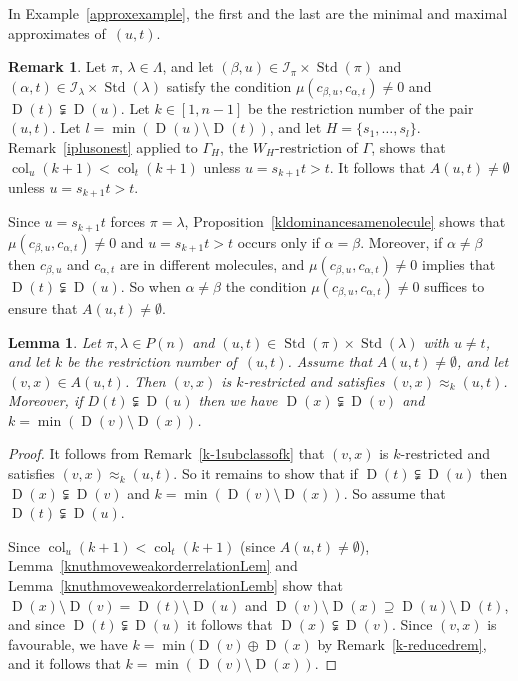 \documentclass[10pt]{amsart}
\newtheorem{lemm}[theo]{Lemma}
\theoremstyle{definition}
\newtheorem{rema}[theo]{Remark}
\DeclareMathOperator{\col}{col}
\DeclareMathOperator{\STD}{Std}
\DeclareMathOperator{\D}{D}
\begin{document}
In Example~\ref{approxexample}, the first and the last are the minimal and maximal approximates of~$(u,t)$.

\begin{rema}\label{nonemptyAkst}
Let $\pi,\,\lambda\in\Lambda$, and
let $(\beta,u)\in\mathcal{I}_{\pi}\times\STD(\pi)$ and
$(\alpha,t)\in\mathcal{I}_{\lambda}\times\STD(\lambda)$ satisfy the condition
$\mu(c_{\beta,u},c_{\alpha,t}) \neq 0$ and $\D(t) \subsetneqq \D(u)$.
Let $k\in[1,n-1]$ be the restriction number of the pair
$(u,t)$. Let $l=\min(\D(u)\setminus\D(t))$, and let
$H=\{s_1,\ldots,s_l\}$. Remark~\ref{iplusonest} applied to $\Gamma_H$,
the $W_H$-restriction of $\Gamma$, shows that $\col_u(k+1)<\col_t(k+1)$
unless $u=s_{k+1}t>t$. It follows that $A(u,t)\ne\emptyset$
unless $u=s_{k+1}t>t$.

Since $u=s_{k+1}t$ forces $\pi=\lambda$, Proposition~\ref{kldominancesamenolecule}
shows that $\mu(c_{\beta,u},c_{\alpha,t}) \neq 0$ and $u=s_{k+1}t>t$ occurs only
if $\alpha=\beta$. Moreover, if $\alpha\neq\beta$ then
$c_{\beta,u}$ and $c_{\alpha,t}$ are in different molecules, and
$\mu(c_{\beta,u},c_{\alpha,t})\neq 0$ implies that $\D(t) \subsetneqq \D(u)$.
So when $\alpha\neq\beta$ the condition $\mu(c_{\beta,u},c_{\alpha,t})\neq 0$
suffices to ensure that $A(u,t)\neq\emptyset$.
\end{rema}

\begin{lemm}\label{k-minimallemma1}
Let $\pi,\lambda\in P(n)$ and $(u,t)\in\STD(\pi)\times\STD(\lambda)$
with $u\neq t$, and let $k$ be the restriction number of~$(u,t)$.
Assume that $A(u,t)\neq\emptyset$, and let
$(v,x)\in A(u,t)$. Then $(v,x)$ is $k$-restricted and satisfies
$(v,x)\approx_k(u,t)$.
Moreover, if $D(t)\subsetneqq\D(u)$ then we have
$\D(x)\subsetneqq\D(v)$ and $k=\min(\D(v)\setminus\D(x))$.
\end{lemm}

\begin{proof}
It follows from Remark~\ref{k-1subclassofk} that $(v,x)$ is $k$-restricted and
satisfies $(v,x)\approx_k(u,t)$. So it remains to show that if $\D(t)\subsetneqq\D(u)$
then $\D(x)\subsetneqq\D(v)$ and $k=\min(\D(v)\setminus\D(x))$. So assume that
$\D(t)\subsetneqq\D(u)$.

Since $\col_u(k+1)<\col_t(k+1)$
(since $A(u,t)\neq\emptyset$), Lemma~\ref{knuthmoveweakorderrelationLem}
and Lemma~\ref{knuthmoveweakorderrelationLemb} show that
$\D(x)\setminus\D(v)=\D(t)\setminus\D(u)$ and
$\D(v)\setminus\D(x)\supseteq\D(u)\setminus\D(t)$, and since
$\D(t)\subsetneqq\D(u)$ it follows that $\D(x)\subsetneqq\D(v)$.
Since $(v,x)$ is favourable, we have $k=\min(\D(v)\oplus\D(x)$
by Remark~\ref{k-reducedrem}, and it follows that $k=\min(\D(v)\setminus\D(x))$.
\end{proof}
\end{document}
